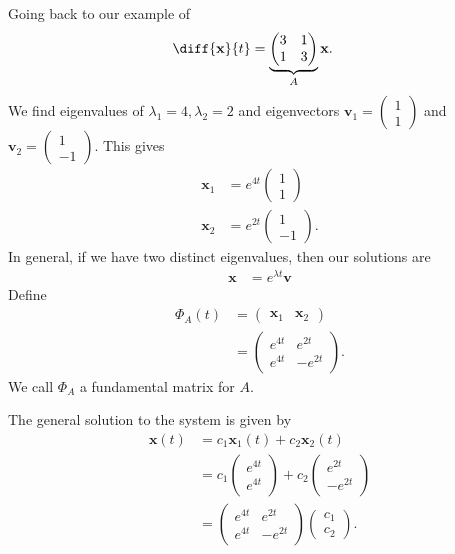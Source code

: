 \documentclass[10pt]{mypackage}
\begin{document}
\begin{example}
  Going back to our example of
  \begin{align*}
    \diff{\mathbf{x}}{t} &= \underbrace{\begin{pmatrix}3 & 1 \\ 1 & 3\end{pmatrix}}_{A}\mathbf{x}.
  \end{align*}
  We find eigenvalues of $\lambda_1 = 4,\lambda_2 = 2$ and eigenvectors $\mathbf{v}_1 = \begin{pmatrix}1\\1\end{pmatrix}$ and $\mathbf{v}_2 = \begin{pmatrix}1\\-1\end{pmatrix}$. This gives
  \begin{align*}
    \mathbf{x}_1 &= e^{4t} \begin{pmatrix}1\\1\end{pmatrix}\\
    \mathbf{x}_2 &= e^{2t} \begin{pmatrix}1\\-1\end{pmatrix}.
  \end{align*}
  In general, if we have two distinct eigenvalues, then our solutions are
  \begin{align*}
    \mathbf{x} &= e^{\lambda t} \mathbf{v}
  \end{align*}
  Define
  \begin{align*}
    \Phi_A(t) &= \begin{pmatrix}\mathbf{x}_1 & \mathbf{x}_2\end{pmatrix}\\
                       &= \begin{pmatrix}e^{4t} & e^{2t} \\ e^{4t} & -e^{2t}\end{pmatrix}.
  \end{align*}
  We call $\Phi_A$ a fundamental matrix for $A$.\newline

  The general solution to the system is given by
  \begin{align*}
    \mathbf{x}(t) &= c_1\mathbf{x}_1(t) + c_2\mathbf{x}_2(t)\\
                  &= c_1 \begin{pmatrix}e^{4t}\\e^{4t}\end{pmatrix} + c_2 \begin{pmatrix}e^{2t} \\ -e^{2t}\end{pmatrix}\\
                  &= \begin{pmatrix}e^{4t} & e^{2t} \\ e^{4t} & -e^{2t}\end{pmatrix} \begin{pmatrix}c_1\\c_2\end{pmatrix}.
  \end{align*}
\end{example}
\end{document}
